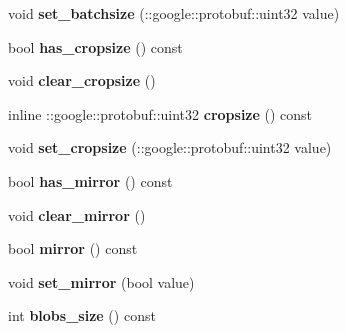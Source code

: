 \begin{DoxyCompactItemize}
void {\bfseries set\+\_\+batchsize} (\+::google\+::protobuf\+::uint32 value)
\item 
\mbox{\label{classcaffe_1_1_v0_layer_parameter_a9a055fb96409a471b507468acfff5c82}} 
bool {\bfseries has\+\_\+cropsize} () const
\item 
\mbox{\label{classcaffe_1_1_v0_layer_parameter_a814e516895e642ab6703d499d7e0cad5}} 
void {\bfseries clear\+\_\+cropsize} ()
\item 
\mbox{\label{classcaffe_1_1_v0_layer_parameter_aae9ebb5ef6a2e7f0f6956567186a90b8}} 
inline \+::google\+::protobuf\+::uint32 {\bfseries cropsize} () const
\item 
\mbox{\label{classcaffe_1_1_v0_layer_parameter_a003b864ffe6b3b7c4405ce5bb0e69e3d}} 
void {\bfseries set\+\_\+cropsize} (\+::google\+::protobuf\+::uint32 value)
\item 
\mbox{\label{classcaffe_1_1_v0_layer_parameter_ade9cad482b5b7166c9828e61371bbb21}} 
bool {\bfseries has\+\_\+mirror} () const
\item 
\mbox{\label{classcaffe_1_1_v0_layer_parameter_ae58bf4b31c408c0d73a5866c147a8938}} 
void {\bfseries clear\+\_\+mirror} ()
\item 
\mbox{\label{classcaffe_1_1_v0_layer_parameter_a135400c7e3fd11b271d2c86b4325d38e}} 
bool {\bfseries mirror} () const
\item 
\mbox{\label{classcaffe_1_1_v0_layer_parameter_aa9dc1dbb4b9eb2662fbaa4b011b0351d}} 
void {\bfseries set\+\_\+mirror} (bool value)
\item 
\mbox{\label{classcaffe_1_1_v0_layer_parameter_a174df2f8c1116094725583215dc115c2}} 
int {\bfseries blobs\+\_\+size} () const
\item 
\mbox{\label{classcaffe_1_1_v0_layer_parameter_a74c4a179ff0f35ec0552ad771e37e594}} 

\end{DoxyCompactItemize}
